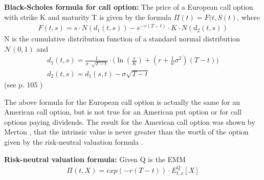 \theoremstyle{proposition}
\begin{proposition}{}\label{BS-price-EuroCall}
\textbf{Black-Scholes formula for call option:} The price of a European call option with strike K and maturity T is given by the formula  $\Pi(t)=F(t,S(t)$, where
\begin{align*}
F(t,s)=s \cdot N(d_1(t,s)) - e^{-r(T-t)}\cdot K \cdot N(d_2(t,s))
\end{align*}
N is the cumulative distribution function of a standard normal distribution $\mathcal{N}(0,1)$ and
\begin{align*}
d_1(t,s)=\frac{1}{\sigma\cdot \sqrt{T-t}} \cdot \bigg( \ln(\frac{s}{K}) + (r+\frac{1}{w} \sigma^2) (T-t) \bigg)\\
d_2(t,s)=d_1(s,t)-\sigma \sqrt{T-t}
\end{align*}
(see p. 105 \parencite{	finKont})
\end{proposition}


The above formula for the European call option is actually the same for an American call option, but is not true for an American put option or for call options paying dividends. The result for the American call option was shown by Merton \parencite{Merton73}, that the intrinsic value is never greater than the worth of the option given by the risk-neutral valuation formula \parencite{finKont}.



\begin{theorem}\label{RNVF}
\textbf{Risk-neutral valuation formula:} Given Q is the EMM
\begin{align}
\Pi(t, X)= exp(-r(T-t))\cdot E_{t,x}^Q[X]
\end{align}
\end{theorem}
